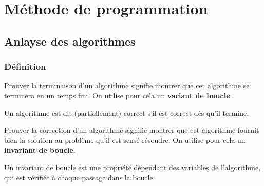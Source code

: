 \setchapterpreamble[u]{\margintoc}

\chapter{Méthode de programmation}





\section{Anlayse des algorithmes}

\subsection{Définition}

\begin{defi}
Prouver la terminaison d'un algorithme signifie montrer que cet algorithme se terminera en un temps fini. On utilise pour cela un \textbf{variant de boucle}.
\end{defi}

\begin{defi}
Un algorithme est dit (partiellement) correct s'il est correct dès qu'il termine. 

\end{defi}
Prouver la correction d'un algorithme signifie montrer que cet algorithme fournit bien la solution au problème qu'il est sensé résoudre. On utilise pour cela un \textbf{invariant de boucle}.

\begin{defi}
Un invariant de boucle est une propriété dépendant des variables de l’algorithme, qui est vérifiée à
chaque passage dans la boucle.
\end{defi}


